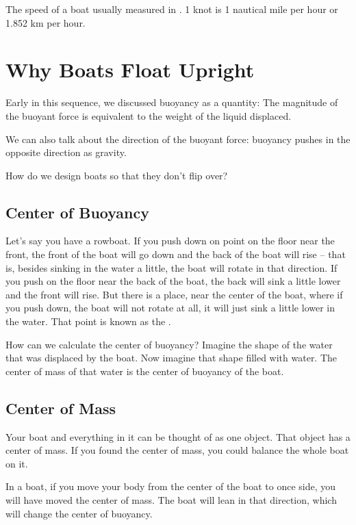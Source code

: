 The speed of a boat usually measured in .  1 knot is 1 nautical mile per hour or 1.852 km per hour.

\section{Why Boats Float Upright}

Early in this sequence, we discussed buoyancy as a quantity: The magnitude of the buoyant force is equivalent to the weight of the liquid displaced.

We can also talk about the direction of the buoyant force: buoyancy pushes in the opposite direction as gravity.

How do we design boats so that they don't flip over?

\subsection{Center of Buoyancy}

Let's say you have a rowboat.   If you push down on point on the floor near the front,  the front of the boat will go down and the back of the boat will rise -- 
that is, besides sinking in the water a little,  the boat will rotate in that direction.   If you push on the floor near the back of the boat,  the back will sink a little lower and the front will rise.  But there is a place, near the center of the boat, where if you push down,  the boat will not rotate at all,  it will just sink a little lower
in the water.    That point is known as the .

How can we calculate the center of buoyancy?  Imagine the shape of the water that was displaced by the boat.   Now imagine that shape filled with water.   The center of mass of that water is the center of buoyancy of the boat.

\subsection{Center of Mass}

Your boat and everything in it can be thought of as one object.  That object has a center of mass.    If you found the center of mass,  you could balance the whole boat on it.

In a boat,  if you move your body from the center of the boat to once side,   you will have moved the center of mass.    The boat will lean in that direction,   which will change the center of buoyancy. 

